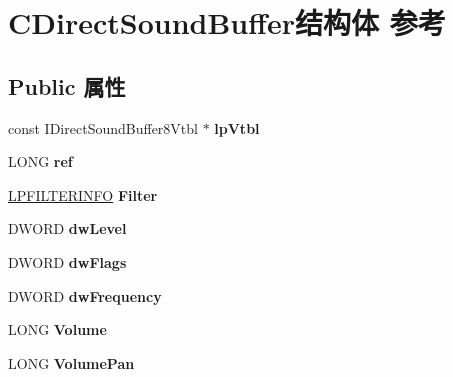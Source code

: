 \hypertarget{struct_c_direct_sound_buffer}{}\section{C\+Direct\+Sound\+Buffer结构体 参考}
\label{struct_c_direct_sound_buffer}
\subsection*{Public 属性}
\begin{DoxyCompactItemize}
\item 
\mbox{\label{struct_c_direct_sound_buffer_a33805e92bb87fc4a77d322399d45acb2}} 
const I\+Direct\+Sound\+Buffer8\+Vtbl $\ast$ {\bfseries lp\+Vtbl}
\item 
\mbox{\label{struct_c_direct_sound_buffer_a30548fbe09254117785a610d4fcc77df}} 
L\+O\+NG {\bfseries ref}
\item 
\mbox{\label{struct_c_direct_sound_buffer_a3e5326b3d74925504caa9b3f9e6d6fee}} 
\hyperlink{structtag_f_i_l_t_e_r_i_n_f_o}{L\+P\+F\+I\+L\+T\+E\+R\+I\+N\+FO} {\bfseries Filter}
\item 
\mbox{\label{struct_c_direct_sound_buffer_ab4599f3837aa1814f53d8facbad1386a}} 
D\+W\+O\+RD {\bfseries dw\+Level}
\item 
\mbox{\label{struct_c_direct_sound_buffer_a95e281dc06d53dd9aa1356828861eff9}} 
D\+W\+O\+RD {\bfseries dw\+Flags}
\item 
\mbox{\label{struct_c_direct_sound_buffer_a938c8dacc93216ff933efc58393129ac}} 
D\+W\+O\+RD {\bfseries dw\+Frequency}
\item 
\mbox{\label{struct_c_direct_sound_buffer_a9fc07e862fc386c7dddedb6deaa1150a}} 
L\+O\+NG {\bfseries Volume}
\item 
\mbox{\label{struct_c_direct_sound_buffer_a81e18655f12a52e0db719816e61c79aa}} 
L\+O\+NG {\bfseries Volume\+Pan}
\item 

\end{DoxyCompactItemize}
